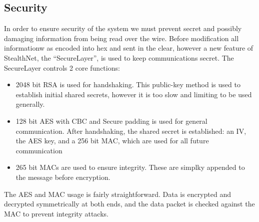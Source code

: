 \subsection{Security}
In order to ensure security of the system we must prevent secret and possibly damaging information from being read over the wire.
Before modification all informationw as encoded into hex and sent in the clear, however a new feature of StealthNet, the ``SecureLayer'', is used to keep communications secret.
The SecureLayer controls 2 core functions:
\begin{itemize}
	\item 2048 bit RSA is used for handshaking.  This public-key method is used to establish initial shared secrets, however it is too slow and limiting to be used generally.
	\item 128 bit AES with CBC and Secure padding is used for general communication.  After handshaking, the shared secret is established: an IV, the AES key, and a 256 bit MAC, which are used for all future communication
	\item 265 bit MACs are used to ensure integrity.  These are simplky appended to the message before encryption.
\end{itemize}
The AES and MAC usage is fairly straightforward.  Data is encrypted and decrypted symmetrically at both ends, and the data packet is checked against the MAC to prevent integrity attacks.

